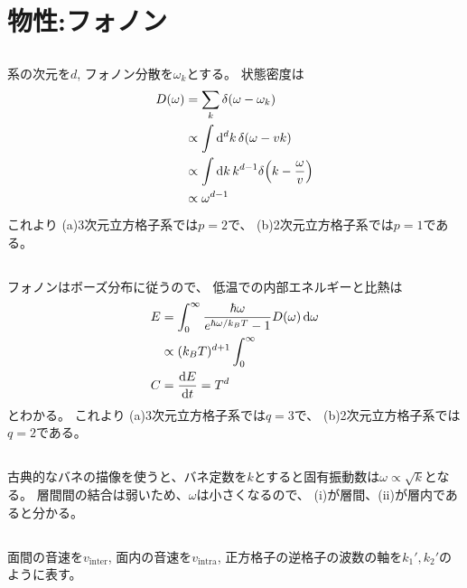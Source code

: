 \documentclass[../ap_2014.tex]{subfiles}
\begin{document}
\setcounter{chapter}{2}
\chapter{物性:フォノン}
\section{}
系の次元を\(d\), フォノン分散を\(\omega_k\)とする。
状態密度は
\begin{equation}\begin{aligned}[b]
    D(\omega)
    &=\sum_k\delta(\omega-\omega_k)\\
    &\propto \int \dd[d]{k} \delta(\omega -vk)\\
    &\propto \int \dd{k} k^{d-1}\delta\qty(k-\frac{\omega}{v})\\
    &\propto \omega^{d-1}
\end{aligned}\end{equation}
これより
(a)3次元立方格子系では\(p=2\)で、
(b)2次元立方格子系では\(p=1\)である。

\section{}
フォノンはボーズ分布に従うので、
低温での内部エネルギーと比熱は
\begin{equation}\begin{aligned}[b]
    E &= \int_{0}^{\infty}\frac{\hbar\omega}{e^{\hbar\omega/k_BT}-1}D(\omega)\dd{\omega}\\
    &\propto (k_BT)^{d+1}\int_{0}^{\infty}\\
    C &= \dv{E}{t} = T^d
\end{aligned}\end{equation}
とわかる。
これより
(a)3次元立方格子系では\(q=3\)で、
(b)2次元立方格子系では\(q=2\)である。

\section{}
古典的なバネの描像を使うと、バネ定数を\(k\)とすると固有振動数は\(\omega\propto\sqrt{k}\)となる。
層間間の結合は弱いため、\(\omega\)は小さくなるので、
(i)が層間、(ii)が層内であると分かる。

\section{}
面間の音速を\(v_\text{inter}\), 面内の音速を\(v_\text{intra}\),
正方格子の逆格子の波数の軸を\(k_1',k_2'\)のように表す。
\end{document}
